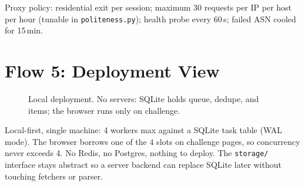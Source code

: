 \documentclass[11pt,a4paper]{article}
\begin{document}
Proxy policy: residential exit per session; maximum 30 requests per IP per host per hour (tunable in \texttt{politeness.py}); health probe every 60\,s; failed ASN cooled for 15\,min.

\section{Flow 5: Deployment View}
\begin{figure}[H]
\centering
{}
\caption{Local deployment. No servers: SQLite holds queue, dedupe, and items; the browser runs only on challenge.}
\label{fig:deploy}
\end{figure}

Local-first, single machine: 4 workers max against a SQLite task table (WAL mode). The browser borrows one of the 4 slots on challenge pages, so concurrency never exceeds 4. No Redis, no Postgres, nothing to deploy. The \texttt{storage/} interface stays abstract so a server backend can replace SQLite later without touching fetchers or parser.

\end{document}

